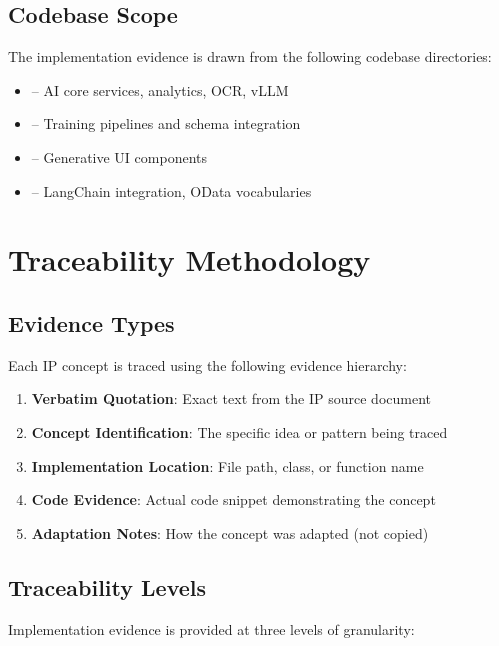 \subsection{Codebase Scope}

The implementation evidence is drawn from the following codebase directories:

\begin{itemize}[nosep]
    \item {} -- AI core services, analytics, OCR, vLLM
    \item {} -- Training pipelines and schema integration
    \item {} -- Generative UI components
    \item {} -- LangChain integration, OData vocabularies
\end{itemize}

\section{Traceability Methodology}

\subsection{Evidence Types}

Each IP concept is traced using the following evidence hierarchy:

\begin{enumerate}[nosep]
    \item \textbf{Verbatim Quotation}: Exact text from the IP source document
    \item \textbf{Concept Identification}: The specific idea or pattern being traced
    \item \textbf{Implementation Location}: File path, class, or function name
    \item \textbf{Code Evidence}: Actual code snippet demonstrating the concept
    \item \textbf{Adaptation Notes}: How the concept was adapted (not copied)
\end{enumerate}

\subsection{Traceability Levels}

Implementation evidence is provided at three levels of granularity:

